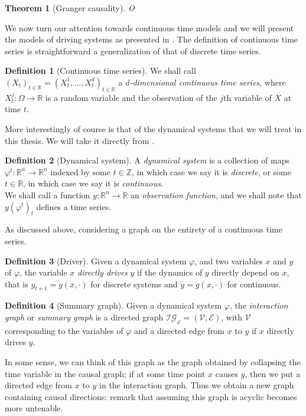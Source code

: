 \documentclass[11pt, a4paper]{memoir}
\theoremstyle{plain}
\newtheorem{thm}{Theorem}
\theoremstyle{definition}
\newtheorem{defn}{Definition}
\newcommand{\mZ}{\mathbb{Z}}
\newcommand{\mR}{\mathbb{R}}
\begin{document}
\begin{thm}[Granger causality]
O
\end{thm}
We now turn our attention towards continuous time models and we will present the models of driving systems as presented in \cite{mathFound}. The definition of continuous time series is straightforward a generalization of that of discrete time series.
\begin{defn}[Continuous time series]
We shall call $(X_t)_{t\in \mR}=(X_t^{1},\ldots,X_{t}^d)_{t\in \mR}$ a \emph{$d$-dimensional continuous time series}, where $X_t^j:\Omega\to \mR$ is a random variable and the observation of the $j$th variable of $X$ at time $t$.
\end{defn}
More interestingly of course is that of the dynamical systems that we will treat in this thesis. We will take it directly from \cite{mathFound}.
\begin{defn}[Dynamical system]
A \emph{dynamical system} is a collection of maps $\varphi^t:\mR^n\to\mR^n$ indexed by some $t\in \mZ$, in which case we say it is \emph{discrete}, or some $t\in \mR$, in which case we say it is \emph{continuous}.\\
We shall call a function $y:\mR^n\to \mR$ an \emph{observation function}, and we shall note that $y(\varphi^t)_t$ defines a time series.
\end{defn}
As discussed above, considering a graph on the entirety of a continuous time series.
\begin{defn}[Driver]
Given a dynamical system $\varphi$, and two variables $x$ and $y$ of $\varphi$, the variable $x$ \emph{directly drives} $y$ if the dynamics of $y$ directly depend on $x$, that is $y_{t+1}=g(x,\cdot)$ for discrete systems and $\dot{y}=g(x,\cdot)$ for continuous.
\end{defn}
\begin{defn}[Summary graph]
Given a dynamical system $\varphi$, the \emph{interaction graph} or \emph{summary graph} is a directed graph $\mathcal{IG}_\varphi=(\mathcal{V},\mathcal{E})$, with $\mathcal{V}$ corresponding to the variables of $\varphi$ and a directed edge from $x$ to $y$ if $x$ directly drives $y$.
\end{defn}
In some sense, we can think of this graph as the graph obtained by collapsing the time variable in the causal graph; if at some time point $x$ causes $y$, then we put a directed edge from $x$ to $y$ in the interaction graph. Thus we obtain a new graph containing causal directions: remark that assuming this graph is acyclic becomes more untenable.
\end{document}
